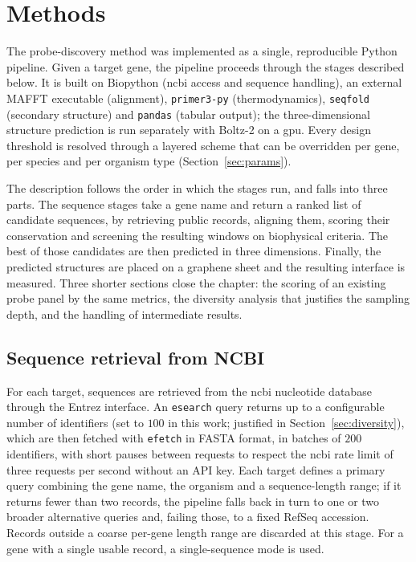 \chapter{Methods}

The probe-discovery method was implemented as a single, reproducible Python pipeline. Given a target
gene, the pipeline proceeds through the stages described below. It is built on Biopython (\acrshort{ncbi}
access and sequence handling), an external MAFFT executable (alignment), \texttt{primer3-py}
(thermodynamics), \texttt{seqfold} (secondary structure) and \texttt{pandas} (tabular output); the
three-dimensional structure prediction is run separately with Boltz-2 on a \acrfull{gpu}. Every design threshold is resolved
through a layered scheme that can be overridden per gene, per species and per organism type
(Section~\ref{sec:params}).

The description follows the order in which the stages run, and falls into three parts. The
sequence stages take a gene name and return a ranked list of candidate sequences, by retrieving
public records, aligning them, scoring their conservation and screening the resulting windows on
biophysical criteria. The best of those candidates are then predicted in three dimensions.
Finally, the predicted structures are placed on a graphene sheet and the resulting interface is
measured. Three shorter sections close the chapter: the scoring of an existing probe panel by the
same metrics, the diversity analysis that justifies the sampling depth, and the handling of
intermediate results.

\section{Sequence retrieval from NCBI}
\label{sec:retrieval}

For each target, sequences are retrieved from the \acrshort{ncbi} nucleotide database through the Entrez
interface. An \texttt{esearch} query returns up to a configurable number of identifiers (set to $100$ in
this work; justified in Section~\ref{sec:diversity}), which are then fetched with \texttt{efetch} in FASTA
format, in batches of $200$ identifiers, with short pauses between requests to respect the \acrshort{ncbi}
rate limit of three requests per second without an API key. Each target defines a primary query combining
the gene name, the organism and a sequence-length range; if it returns fewer than two records, the
pipeline falls back in turn to one or two broader alternative queries and, failing those, to a fixed RefSeq
accession. Records outside a coarse per-gene length range are discarded at this stage. For a gene with a
single usable record, a single-sequence mode is used.


